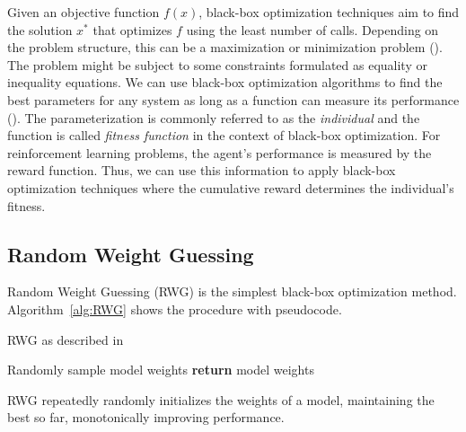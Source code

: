 Given an objective function $f(x)$, black-box optimization techniques aim to find the solution $x^*$ that optimizes $f$ using the least number of calls. Depending on the problem structure, this can be a maximization or minimization problem (\cite{ollivier2017information}). The problem might be subject to some constraints formulated as equality or inequality equations. We can use black-box optimization algorithms to find the best parameters for any system as long as a function can measure its performance (\cite{golovin2017google}). The parameterization is commonly referred to as the \textit{individual} and the function is called \textit{fitness function} in the context of black-box optimization. For reinforcement learning problems, the agent's performance is measured by the reward function. Thus, we can use this information to apply black-box optimization techniques where the cumulative reward determines the individual's fitness.


\subsection{Random Weight Guessing}
Random Weight Guessing (RWG) is the simplest black-box optimization method. Algorithm~\ref{alg:RWG} shows the procedure with pseudocode.
\begin{algorithm}
\caption{RWG as described in \cite{schmidhuber2001evaluating}}
\begin{algorithmic}[1]
\Repeat
    \State Randomly sample model weights
\State \textbf{return} model weights
\end{algorithmic}
\label{alg:RWG}
\end{algorithm}
RWG repeatedly randomly initializes the weights of a model, maintaining the best so far, monotonically improving performance.


